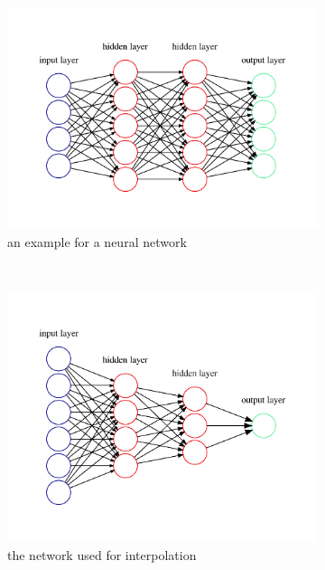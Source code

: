 \begin{figure}[h] %
	\centering
	\begin{subfigure}[t]{0.5\textwidth}
		\centering
		\includegraphics[width=\linewidth]{images/graphviz/general.pdf}
		\caption{an example for a neural network}
		\label{fig:neuralnetwork-general}
	\end{subfigure}%
	~ 
	\begin{subfigure}[t]{0.5\textwidth}
		\centering
		\includegraphics[width=\linewidth]{images/graphviz/graph.pdf}
		\caption{the network used for interpolation}
		\label{fig:neuralnetwork-graph}
	\end{subfigure}
	\caption{}
	
\end{figure}

